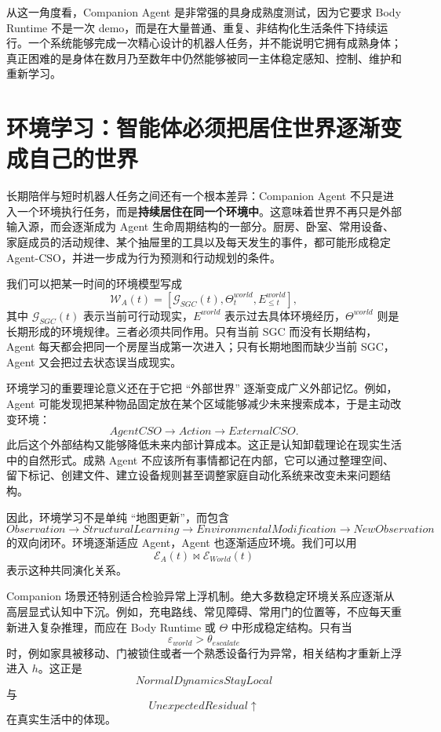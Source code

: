 从这一角度看，Companion Agent 是非常强的具身成熟度测试，因为它要求 Body Runtime 不是一次 demo，而是在大量普通、重复、非结构化生活条件下持续运行。一个系统能够完成一次精心设计的机器人任务，并不能说明它拥有成熟身体；真正困难的是身体在数月乃至数年中仍然能够被同一主体稳定感知、控制、维护和重新学习。

\section{环境学习：智能体必须把居住世界逐渐变成自己的世界}

长期陪伴与短时机器人任务之间还有一个根本差异：Companion Agent 不只是进入一个环境执行任务，而是\textbf{持续居住在同一个环境中}。这意味着世界不再只是外部输入源，而会逐渐成为 Agent 生命周期结构的一部分。厨房、卧室、常用设备、家庭成员的活动规律、某个抽屉里的工具以及每天发生的事件，都可能形成稳定 Agent-CSO，并进一步成为行为预测和行动规划的条件。

我们可以把某一时间的环境模型写成
\[
\mathcal W_A(t)
=
\left[
\mathcal G_{SGC}(t),
\Theta^{world}_t,
E^{world}_{\leq t}
\right],
\]
其中 $\mathcal G_{SGC}(t)$ 表示当前可行动现实，$E^{world}$ 表示过去具体环境经历，$\Theta^{world}$ 则是长期形成的环境规律。三者必须共同作用。只有当前 SGC 而没有长期结构，Agent 每天都会把同一个房屋当成第一次进入；只有长期地图而缺少当前 SGC，Agent 又会把过去状态误当成现实。

环境学习的重要理论意义还在于它把 ``外部世界'' 逐渐变成广义外部记忆。例如，Agent 可能发现把某种物品固定放在某个区域能够减少未来搜索成本，于是主动改变环境：
\[
AgentCSO
\rightarrow
Action
\rightarrow
ExternalCSO.
\]
此后这个外部结构又能够降低未来内部计算成本。这正是认知卸载理论在现实生活中的自然形式。成熟 Agent 不应该所有事情都记在内部，它可以通过整理空间、留下标记、创建文件、建立设备规则甚至调整家庭自动化系统来改变未来问题结构。

因此，环境学习不是单纯 ``地图更新''，而包含
\[
Observation
\rightarrow
StructuralLearning
\rightarrow
EnvironmentalModification
\rightarrow
NewObservation
\]
的双向闭环。环境逐渐适应 Agent，Agent 也逐渐适应环境。我们可以用
\[
\mathcal E_{A}(t)
\bowtie
\mathcal E_{World}(t)
\]
表示这种共同演化关系。

Companion 场景还特别适合检验异常上浮机制。绝大多数稳定环境关系应逐渐从高层显式认知中下沉。例如，充电路线、常见障碍、常用门的位置等，不应每天重新进入复杂推理，而应在 Body Runtime 或 $\Theta$ 中形成稳定结构。只有当
\[
\varepsilon_{world}
>
\theta_{escalate}
\]
时，例如家具被移动、门被锁住或者一个熟悉设备行为异常，相关结构才重新上浮进入 $h$。这正是
\[
NormalDynamicsStayLocal
\]
与
\[
UnexpectedResidual\uparrow
\]
在真实生活中的体现。

